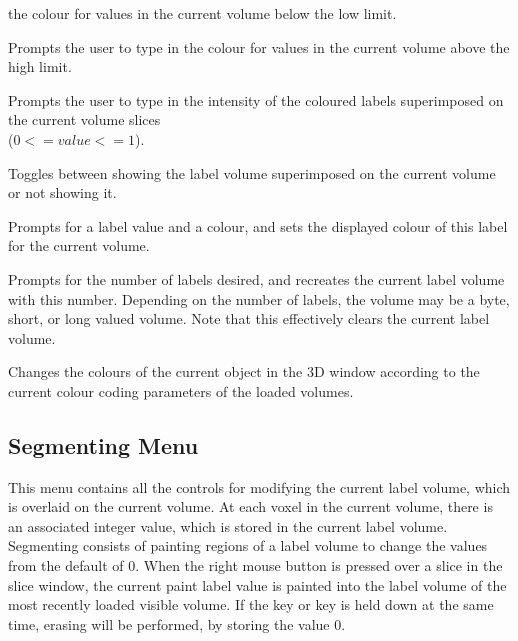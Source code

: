 \begin{description}
               the colour for values in the current volume below the low limit.
\item[\menutwo{Colour Coding}{Over Colour}]  Prompts the user to type in
               the colour for values in the current volume above the high limit.
\item[\menutwo{Colour Coding}{Label Ratio}]  Prompts the user to type in the
                      intensity of the coloured labels superimposed on the 
                      current volume slices \\
                      ($0 <= value <= 1$).
\item[\menutwo{Colour Coding}{Show Labels}]  Toggles between showing
                      the label volume superimposed on the current
                      volume or not showing it.
\item[\menutwo{Colour Coding}{Set Paint Lbl Colr}]  Prompts for a
                      label value and a colour, and sets the displayed
                      colour of this label for the current volume.
\item[\menutwo{Colour Coding}{Num Labels}]  Prompts for the number
                      of labels desired, and recreates the current label volume
                      with this number.  Depending on the number of labels,
                      the volume may be a byte, short, or long valued volume.
                      Note that this effectively clears the current
                      label volume.
\item[\menutwo{Colour Coding}{Colour Code Object}]  Changes the
     colours of the current object in the 3D window according to the current
     colour coding parameters of the loaded volumes.
\end{description}

\subsection{Segmenting Menu}

This menu contains all the controls for modifying the current label volume,
which is overlaid on the current volume.  At each voxel in the current
volume, there is an associated integer value, which is
stored in the current label volume.  Segmenting consists of painting regions
of a label volume to change the values from the default of 0.
When the right mouse button is pressed over a slice in the slice
window, the current paint label value is painted into the label volume of the
most recently loaded visible volume.  If the  key or
 key is held down
at the same time, erasing will be performed, by storing the value 0.

